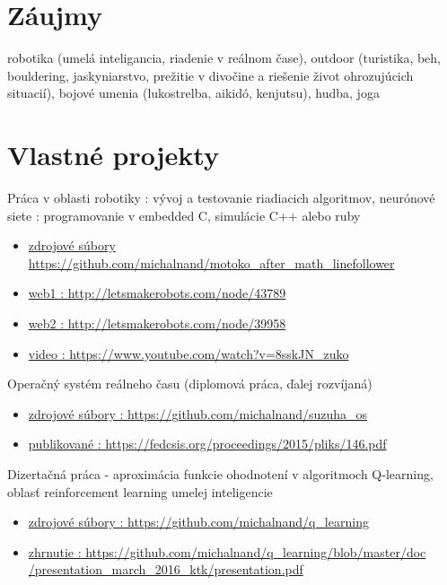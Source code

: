 \documentclass[10pt]{article}
\begin{document}
\section*{Záujmy}
robotika (umelá inteligancia, riadenie v reálnom čase),
outdoor (turistika, beh, bouldering, jaskyniarstvo, prežitie v divočine a riešenie život ohrozujúcich situacií),
bojové umenia (lukostrelba, aikidó, kenjutsu), hudba, joga

\section*{Vlastné projekty}

Práca v oblasti robotiky : vývoj a testovanie riadiacich algoritmov, neurónové
siete : programovanie v embedded C, simulácie C++ alebo ruby
\begin{itemize}
\item \href{https://github.com/michalnand/motoko\_after\_math\_linefollower}{zdrojové súbory https://github.com/michalnand/motoko\_after\_math\_linefollower}
\item \href{http://letsmakerobots.com/node/43789}{web1 : http://letsmakerobots.com/node/43789}
\item \href{http://letsmakerobots.com/node/39958}{web2 : http://letsmakerobots.com/node/39958}
\item \href{https://www.youtube.com/watch?v=8sskJN\_zuko}{video : https://www.youtube.com/watch?v=8sskJN\_zuko}
\end{itemize}

Operačný systém reálneho času (diplomová práca, ďalej rozvíjaná)
\begin{itemize}
\item \href{https://github.com/michalnand/suzuha\_os}{zdrojové súbory : https://github.com/michalnand/suzuha\_os}
\item \href{https://fedcsis.org/proceedings/2015/pliks/146.pdf}{publikované : https://fedcsis.org/proceedings/2015/pliks/146.pdf}
\end{itemize}

Dizertačná práca - aproximácia funkcie ohodnotení v algoritmoch Q-learning,
oblasť reinforcement learning umelej inteligencie
\begin{itemize}
\item \href{https://github.com/michalnand/q\_learning}{zdrojové súbory : https://github.com/michalnand/q\_learning}
\item \href{https://github.com/michalnand/q\_learning/blob/master/doc/presentation\_march\_2016\_ktk/presentation.pdf}{zhrnutie : https://github.com/michalnand/q\_learning/blob/master/doc\\
                  /presentation\_march\_2016\_ktk/presentation.pdf}
\end{itemize}
\end{document}
